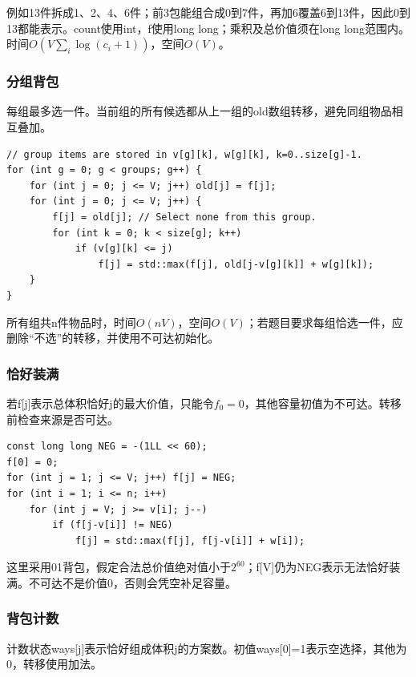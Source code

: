 \documentclass[UTF8,11pt,a4paper,fontset=none]{ctexart}
\begin{document}
例如13件拆成1、2、4、6件；前3包能组合成0到7件，再加6覆盖6到13件，因此0到13都能表示。count使用int，f使用long long；乘积及总价值须在long long范围内。时间$O(V\sum_i\log(c_i+1))$，空间$O(V)$。
\subsubsection{分组背包}
每组最多选一件。当前组的所有候选都从上一组的old数组转移，避免同组物品相互叠加。
\par\noindent\begin{minipage}{\linewidth}
\begin{lstlisting}
// group items are stored in v[g][k], w[g][k], k=0..size[g]-1.
for (int g = 0; g < groups; g++) {
    for (int j = 0; j <= V; j++) old[j] = f[j];
    for (int j = 0; j <= V; j++) {
        f[j] = old[j]; // Select none from this group.
        for (int k = 0; k < size[g]; k++)
            if (v[g][k] <= j)
                f[j] = std::max(f[j], old[j-v[g][k]] + w[g][k]);
    }
}
\end{lstlisting}
\end{minipage}\par
所有组共n件物品时，时间$O(nV)$，空间$O(V)$；若题目要求每组恰选一件，应删除“不选”的转移，并使用不可达初始化。
\subsubsection{恰好装满}
若f[j]表示总体积恰好j的最大价值，只能令$f_0=0$，其他容量初值为不可达。转移前检查来源是否可达。
\par\noindent\begin{minipage}{\linewidth}
\begin{lstlisting}
const long long NEG = -(1LL << 60);
f[0] = 0;
for (int j = 1; j <= V; j++) f[j] = NEG;
for (int i = 1; i <= n; i++)
    for (int j = V; j >= v[i]; j--)
        if (f[j-v[i]] != NEG)
            f[j] = std::max(f[j], f[j-v[i]] + w[i]);
\end{lstlisting}
\end{minipage}\par
这里采用01背包，假定合法总价值绝对值小于$2^{60}$；f[V]仍为NEG表示无法恰好装满。不可达不是价值0，否则会凭空补足容量。
\subsubsection{背包计数}
计数状态ways[j]表示恰好组成体积j的方案数。初值ways[0]=1表示空选择，其他为0，转移使用加法。
\end{document}
